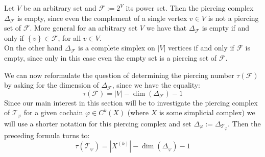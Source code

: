 \begin{expl}
Let \(V\) be an arbitrary set and \(\mathcal{F}:=2^V\) its power set. Then the piercing complex \(\Delta_{\mathcal{F}}\) is empty, since even the complement of a single vertex \(v\in V\) is not a piercing set of \(\mathcal{F}\). More general for an arbitrary set \(V\) we have that \(\Delta_{\mathcal{F}}\) is empty if and only if \(\left\{v\right\}\in\mathcal{F}\), for all \(v\in V\).\\
On the other hand \(\Delta_{\mathcal{F}}\) is a complete simplex on \(\left|V\right|\) vertices if and only if \(\mathcal{F}\) is empty, since only in this case even the empty set is a piercing set of \(\mathcal{F}\).
\end{expl}

We can now reformulate the question of determining the piercing number \(\tau(\mathcal{F})\) by asking for the dimension of \(\Delta_{\mathcal{F}}\), since we have the equality:
\[
\tau(\mathcal{F})=\left| V\right|-\dim(\Delta_{\mathcal{F}})-1
\]
Since our main interest in this section will be to investigate the piercing complex of \(\mathcal{T}_{\varphi}\) for a given cochain \(\varphi\in C^k(X)\) (where \(X\) is some simplicial complex) we will use a shorter notation for this piercing complex and set \(\Delta_{\varphi}:=\Delta_{\mathcal{T}_{\varphi}}\). Then the preceding formula turns to:
\[
\tau(\mathcal{T}_{\varphi})=|X^{(k)}|-\dim(\Delta_{\varphi})-1
\]

%



